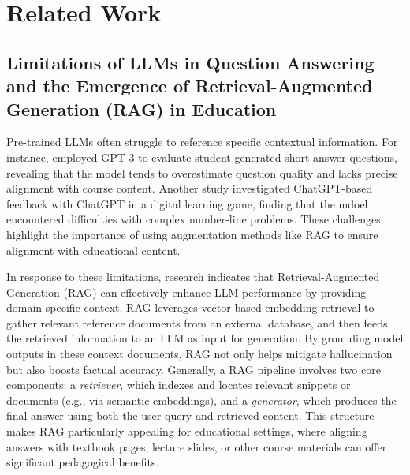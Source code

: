 \documentclass[runningheads]{llncs}
\begin{document}
\section{Related Work}


\subsection{Limitations of LLMs in Question Answering and the Emergence of Retrieval-Augmented Generation (RAG) in Education}

Pre-trained LLMs often struggle to reference specific contextual information. For instance, \cite{moore2022assessing} employed GPT-3 to evaluate student-generated short-answer questions, revealing that the model tends to overestimate question quality and lacks precise alignment with course content. Another study \cite{nguyen2023evaluating} investigated ChatGPT-based feedback with ChatGPT in a digital learning game, finding that the mdoel encountered difficulties with complex number-line problems. These challenges highlight the importance of using augmentation methods like RAG to ensure alignment with educational content.

In response to these limitations, research \cite{chen2024systematic,gao2024retrievalaugmentedgenerationlargelanguage,wang2024largelanguagemodelseducation} indicates that Retrieval-Augmented Generation (RAG) can effectively enhance LLM performance by providing domain-specific context. RAG leverages vector-based embedding retrieval to gather relevant reference documents from an external database, and then feeds the retrieved information to an LLM as input for generation. By grounding model outputs in these context documents, RAG not only helps mitigate hallucination but also boosts factual accuracy. Generally, a RAG pipeline involves two core components: a \emph{retriever}, which indexes and locates relevant snippets or documents (e.g., via semantic embeddings), and a \emph{generator}, which produces the final answer using both the user query and retrieved content. This structure makes RAG particularly appealing for educational settings, where aligning answers with textbook pages, lecture slides, or other course materials can offer significant pedagogical benefits.
\end{document}
